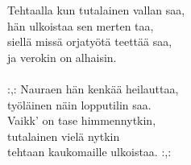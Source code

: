
            Tehtaalla kun tutalainen vallan saa, \\
            hän ulkoistaa sen merten taa, \\
            siellä missä orjatyötä teettää saa, \\
            ja verokin on alhaisin. \\
\hspace{10mm} \\
            :,: Nauraen hän kenkää heilauttaa, \\
            työläinen näin lopputilin saa. \\
            Vaikk' on tase himmennytkin, \\
            tutalainen vielä nytkin \\
            tehtaan kaukomaille ulkoistaa. :,: \\
